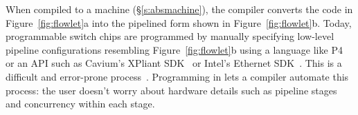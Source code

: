 When compiled to a \absmachine machine (\S\ref{s:absmachine}), the
\pktlanguage compiler converts the code in Figure~\ref{fig:flowlet}a into the
pipelined form shown in Figure~\ref{fig:flowlet}b. Today, programmable switch
chips are programmed by manually specifying low-level pipeline configurations
resembling Figure~\ref{fig:flowlet}b using a language like P4 or an API such as
Cavium's XPliant SDK~\cite{xpliant_sdk} or Intel's Ethernet
SDK~\cite{intel_sdk}. This is a difficult and error-prone
process~\cite{p4-semantics}.  Programming in \pktlanguage lets a compiler
automate this process: the user doesn't worry about hardware details such as
pipeline stages and concurrency within each stage.
